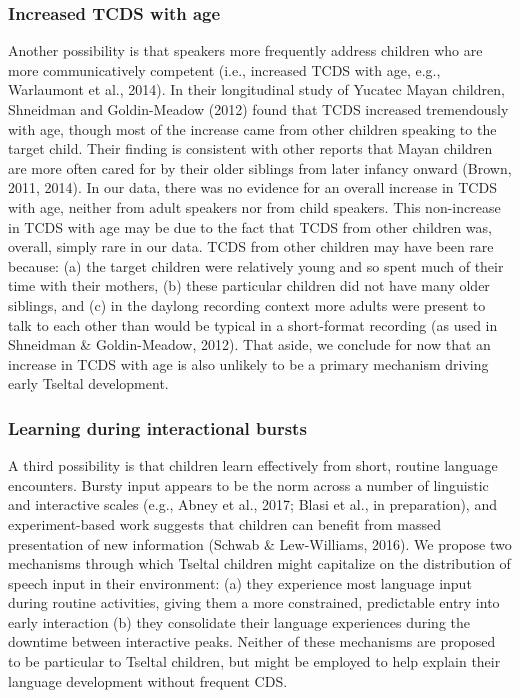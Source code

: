 \documentclass[,man,floatsintext]{apa6}
\begin{document}
\subsubsection{Increased TCDS with age}\label{increased-tcds-with-age}

Another possibility is that speakers more frequently address children
who are more communicatively competent (i.e., increased TCDS with age,
e.g., Warlaumont et al., 2014). In their longitudinal study of Yucatec
Mayan children, Shneidman and Goldin-Meadow (2012) found that TCDS
increased tremendously with age, though most of the increase came from
other children speaking to the target child. Their finding is consistent
with other reports that Mayan children are more often cared for by their
older siblings from later infancy onward (Brown, 2011, 2014). In our
data, there was no evidence for an overall increase in TCDS with age,
neither from adult speakers nor from child speakers. This non-increase
in TCDS with age may be due to the fact that TCDS from other children
was, overall, simply rare in our data. TCDS from other children may have
been rare because: (a) the target children were relatively young and so
spent much of their time with their mothers, (b) these particular
children did not have many older siblings, and (c) in the daylong
recording context more adults were present to talk to each other than
would be typical in a short-format recording (as used in Shneidman \&
Goldin-Meadow, 2012). That aside, we conclude for now that an increase
in TCDS with age is also unlikely to be a primary mechanism driving
early Tseltal development.

\subsubsection{Learning during interactional
bursts}\label{learning-during-interactional-bursts}

A third possibility is that children learn effectively from short,
routine language encounters. Bursty input appears to be the norm across
a number of linguistic and interactive scales (e.g., Abney et al., 2017;
Blasi et al., in preparation), and experiment-based work suggests that
children can benefit from massed presentation of new information (Schwab
\& Lew-Williams, 2016). We propose two mechanisms through which Tseltal
children might capitalize on the distribution of speech input in their
environment: (a) they experience most language input during routine
activities, giving them a more constrained, predictable entry into early
interaction (b) they consolidate their language experiences during the
downtime between interactive peaks. Neither of these mechanisms are
proposed to be particular to Tseltal children, but might be employed to
help explain their language development without frequent CDS.
\end{document}
